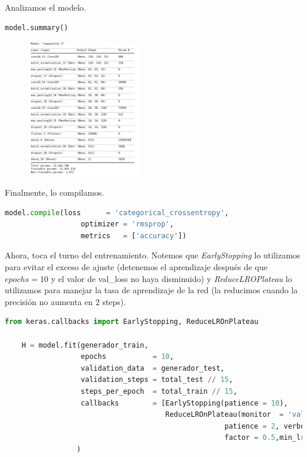 \documentclass[letterpaper,11pt]{article}
\begin{document}
\begin{enumerate}
    Analizamos el modelo.
    \begin{lstlisting}[language=Python]
        model.summary()
    \end{lstlisting}

    \begin{figure}[ht]
        \centering
        \includegraphics[width=0.45\textwidth]{./imagenes/modelo.png}
    \end{figure} 

    Finalmente, lo compilamos. 
    \begin{lstlisting}[language=Python]
    model.compile(loss      = 'categorical_crossentropy',
                  optimizer = 'rmsprop',
                  metrics   = ['accuracy'])
    \end{lstlisting}

    Ahora, toca el turno del entrenamiento. Notemos que \textit{EarlyStopping}
    lo utilizamos para evitar el exceso de ajuste (detenemos el aprendizaje 
    después de que $epochs = 10$ y el valor de val\_loss no haya disminuido) y 
    \textit{ReduceLROPlateau} lo utilizamos para manejar la tasa de aprendizaje 
    de la red (la reducimos cuando la precisión no aumenta en $2$ steps). 
    \begin{lstlisting}[language=Python]
    from keras.callbacks import EarlyStopping, ReduceLROnPlateau

    H = model.fit(generador_train, 
                  epochs           = 10,
                  validation_data  = generador_test,
                  validation_steps = total_test // 15,
                  steps_per_epoch  = total_train // 15,
                  callbacks        = [EarlyStopping(patience = 10), 
                                      ReduceLROnPlateau(monitor  = 'val_accuracy',
                                                    patience = 2, verbose = 1,
                                                    factor = 0.5,min_lr = 0.00001)]
                 )
    \end{lstlisting}


\end{enumerate}
\end{document}
